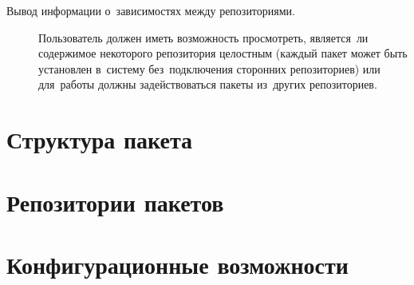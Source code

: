 \begin{description}
\item[Вывод информации о~зависимостях между репозиториями.]
Пользователь должен иметь возможность просмотреть, 
является~ли содержимое некоторого репозитория целостным (каждый пакет может быть установлен в~систему без~подключения сторонних репозиториев)
или для~работы должны задействоваться пакеты из~других репозиториев. 

\end{description}

\section{Структура пакета}
\label{pkgstruct}

\section{Репозитории пакетов}
\section{Конфигурационные возможности}

